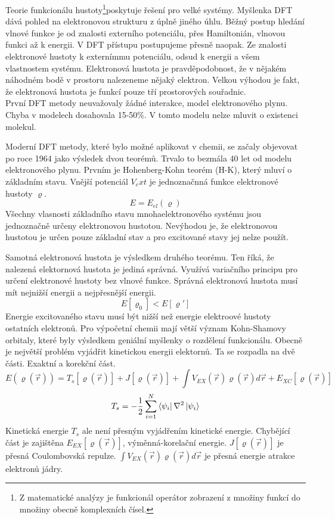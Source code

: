 \documentclass[
  digital, %
  table,   %
  lof,     %
  lot,     %
]{fithesis3}
\begin{document}
Teorie funkcionálu hustoty\footnote{Z matematické analýzy je funkcionál operátor zobrazení z množiny funkcí do množiny obecně komplexních čísel.}poskytuje řešení pro velké systémy. Myšlenka DFT dává pohled na elektronovou strukturu z úplně jiného úhlu. Běžný postup hledání vlnové funkce je od znalosti externího potenciálu, přes Hamiltonián, vlnovou funkci až k energii. V DFT přístupu postupujeme přesně naopak. Ze znalosti elektronové hustoty k externímmu potenciálu, odsud k energii a všem vlastnostem systému. Elektronová hustota je pravděpodobnost, že v nějakém náhodném bodě v prostoru nalezeneme nějaký elektron. Velkou výhodou je fakt, že elektronová hustota je funkcí pouze tří prostorových souřadnic. \\
První DFT metody neuvažovaly žádné interakce, model elektronového plynu. Chyba v modelech dosahovala 15-50\%. V tomto modelu nelze mluvit o existenci molekul.\cite{jensen2007introduction}

Moderní DFT metody, které bylo možné aplikovat v chemii, se začaly objevovat po roce 1964 jako výsledek dvou teorémů. Trvalo to bezmála 40 let od modelu elektronového plynu. Prvním je Hohenberg-Kohn teorém (H-K), který mluví o základním stavu. Vnější potenciál  $V_ext$ je jednoznačnná funkce elektronové hustoty $\varrho$.
\begin{equation}
E = E_{el} (\varrho)
\end{equation}
 Všechny vlasnosti základního stavu mnohaelektronového systému jsou jednoznačně určeny elektronovou hustotou. Nevýhodou je, že elektronovou hustotou je určen pouze základní stav a pro excitované stavy jej nelze použít.

Samotná elektronová hustota je výsledkem druhého teorému. Ten říká, že nalezená elektornová hustota je jediná správná. Využívá variačního principu pro určení elektronové hustoty bez vlnové funkce. Správná elektronová hustota musí mít nejnižší energii a nejpřesnější energii.
\begin{equation}
E [\varrho_0] < E[\varrho ']
\end{equation}
 Energie excitovaného stavu musí být nižší než energie elektroové hustoty ostatních elektronů. Pro výpočetní chemii mají větší význam Kohn-Shamovy orbitaly, které byly výsledkem geniální myšlenky o rozdělení funkcionálu. Obecně je největší problém vyjádřit kinetickou energii elektornů. Ta se rozpadla na dvě části. Exaktní a korekční část.
\begin{equation}
E(\varrho(\vec{r})) = T_s[\varrho(\vec{r})] + J[\varrho(\vec{r})] + \int V_{EX}(\vec{r})\varrho(\vec{r})d\vec{r} + E_{XC}[\varrho(\vec{r})]
\end{equation}
 \cite{jensen2007introduction}\cite{koch2000chemist}
 \begin{equation}
 T_s = -\frac{1}{2} \sum_{i=1}^{N}  \bra{\psi_i}{\nabla^{2}}\ket{\psi_i}
 \label{kineticka_energie_jednoelektronova}
 \end{equation}
 Kinetická energie $T_s$ ale není přesným vyjádřením kinetické energie. Chybějící část je zajištěna $E_{EX}[\varrho(\vec{r})]$, výměnná-korelační energie. $J[\varrho(\vec{r})]$ je přesná Coulombovská repulze. $\int V_{EX}(\vec{r})\varrho(\vec{r})d\vec{r}$ je přesná energie atrakce elektronů jádry.  \cite{parr1994density}
\end{document}
